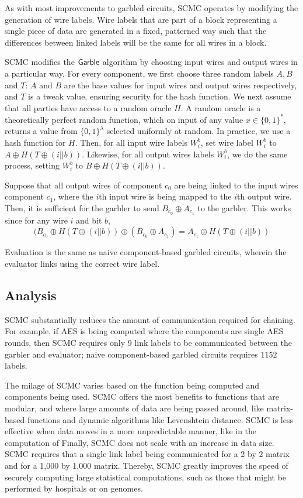 As with most improvements to garbled circuits, SCMC operates by modifying the generation of wire labels. 
Wire labels that are part of a block representing a single piece of data are generated in a fixed, patterned way such that the differences between linked labels will be the same for all wires in a block. 

SCMC modifies the $\sf{Garble}$ algorithm by choosing input wires and output wires in a particular way. 
For every component, we first choose three random labels $A,B$ and $T$: $A$ and $B$ are the base values for input wires and output wires respectively, and $T$ is a tweak value, ensuring security for the hash function.
We next assume that all parties have access to a random oracle $H$. 
A random oracle is a theoretically perfect random function, which on input of any value $x \in \{0,1\}^*$, returns a value from $\{0,1\}^{\lambda}$ selected uniformly at random.
In practice, we use a hash function for $H$. 
Then, for all input wire labels $W_i^b$, set wire label $W_i^b$ to $A \oplus H(T \oplus (i || b))$. 
Likewise, for all output wires labels $W_i^b$, we do the same process, setting $W_i^b$ to $B \oplus H(T \oplus (i || b))$.

Suppose that all output wires of component $c_0$ are being linked to the input wires component $c_1$, where the $i$th input wire is being mapped to the $i$th output wire. 
Then, it is sufficient for the garbler to send $B_{c_0} \oplus A_{c_1}$ to the garbler. 
This works since for any wire $i$ and bit $b$,
\begin{equation}
(B_{c_0} \oplus H(T \oplus (i || b)) \oplus (B_{c_0} \oplus A_{c_1}) = A_{c_1} \oplus H(T \oplus (i || b))
\end{equation}

Evaluation is the same as naive component-based garbled circuits, wherein the evaluator links using the correct wire label.

\subsection{Analysis}
SCMC substantially reduces the amount of communication required for chaining. 
For example, if AES is being computed where the components are single AES rounds, then SCMC requires only $9$ link labels to be communicated between the garbler and evaluator; naive component-based garbled circuits requires $1152$ labels. 

The milage of SCMC varies based on the function being computed and components being used. 
SCMC offers the most benefits to functions that are modular, and where large amounts of data are being passed around, like matrix-based functions and dynamic algorithms like Levenshtein distance. 
SCMC is less effective when data moves in a more unpredictable manner, like in the computation of 
Finally, SCMC does not scale with an increase in data size. 
SCMC requires that a single link label being communicated for a 2 by 2 matrix and for a 1,000 by 1,000 matrix. 
Thereby, SCMC greatly improves the speed of securely computing large statistical computations, such as those that might be performed by hospitals or on genomes. 

